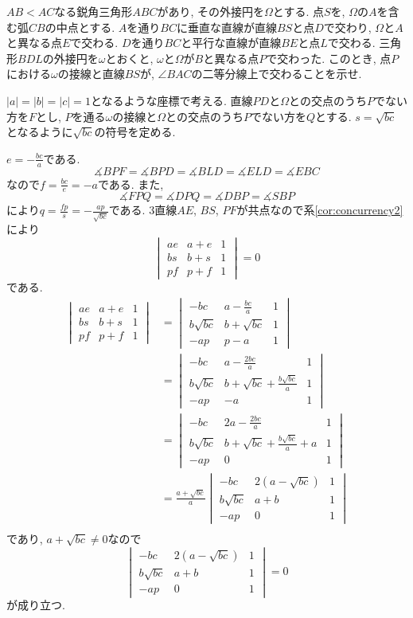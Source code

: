 \begin{bprb}[IMO2023-2]
$AB<AC$なる鋭角三角形$ABC$があり, その外接円を$\Omega$とする.
点$S$を, $\Omega$の$A$を含む弧$CB$の中点とする.
$A$を通り$BC$に垂直な直線が直線$BS$と点$D$で交わり, $\Omega$と$A$と異なる点$E$で交わる.
$D$を通り$BC$と平行な直線が直線$BE$と点$L$で交わる.
三角形$BDL$の外接円を$\omega$とおくと, $\omega$と$\Omega$が$B$と異なる点$P$で交わった.
このとき, 点$P$における$\omega$の接線と直線$BS$が, $\angle BAC$の二等分線上で交わることを示せ.
\end{bprb}
\begin{ifsol*}
$\lvert a\rvert=\lvert b\rvert=\lvert c\rvert=1$となるような座標で考える.
直線$PD$と$\Omega$との交点のうち$P$でない方を$F$とし, $P$を通る$\omega$の接線と$\Omega$との交点のうち$P$でない方を$Q$とする.
$s=\sqrt{bc}$となるように$\sqrt{bc}$の符号を定める.

$e=-\frac{bc}{a}$である.
\[\measuredangle BPF=\measuredangle BPD=\measuredangle BLD=\measuredangle ELD=\measuredangle EBC\]
なので$f=\frac{bc}{e}=-a$である.
また,
\[\measuredangle FPQ=\measuredangle DPQ=\measuredangle DBP=\measuredangle SBP\]
により$q=\frac{fp}{s}=-\frac{ap}{\sqrt{bc}}$である.
$3$直線$AE$, $BS$, $PF$が共点なので系\ref{cor:concurrency2}により
\[\begin{vmatrix}ae&a+e&1\\bs&b+s&1\\pf&p+f&1\end{vmatrix}=0\]
である.
\begin{align*}
\begin{vmatrix}ae&a+e&1\\bs&b+s&1\\pf&p+f&1\end{vmatrix}
&=\begin{vmatrix}-bc&a-\frac{bc}{a}&1\\b\sqrt{bc}&b+\sqrt{bc}&1\\-ap&p-a&1\end{vmatrix}\\
&=\begin{vmatrix}-bc&a-\frac{2bc}{a}&1\\b\sqrt{bc}&b+\sqrt{bc}+\frac{b\sqrt{bc}}{a}&1\\-ap&-a&1\end{vmatrix}\\
&=\begin{vmatrix}-bc&2a-\frac{2bc}{a}&1\\b\sqrt{bc}&b+\sqrt{bc}+\frac{b\sqrt{bc}}{a}+a&1\\-ap&0&1\end{vmatrix}\\
&=\frac{a+\sqrt{bc}}{a}\begin{vmatrix}-bc&2(a-\sqrt{bc})&1\\b\sqrt{bc}&a+b&1\\-ap&0&1\end{vmatrix}\\
\end{align*}
であり, $a+\sqrt{bc}\neq 0$なので
\[\begin{vmatrix}-bc&2(a-\sqrt{bc})&1\\b\sqrt{bc}&a+b&1\\-ap&0&1\end{vmatrix}=0\]
が成り立つ.


\end{ifsol*}
